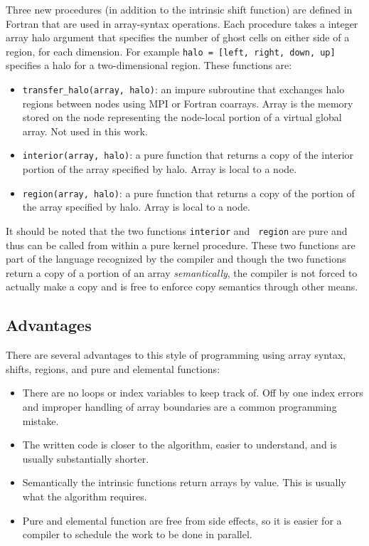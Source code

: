 Three new procedures (in addition to the intrinsic shift function) are
defined in Fortran that are used in array-syntax operations.  Each
procedure takes a integer array halo argument that specifies the
number of ghost cells on either side of a region, for each dimension.
For example {\tt halo = [left, right, down, up]} specifies a halo for
a two-dimensional region.  These functions are:

\begin{itemize}

\item {\tt transfer\_halo(array, halo)}: an impure subroutine that
  exchanges halo regions between nodes using MPI or Fortran
  coarrays. Array is the memory stored on the node representing the
  node-local portion of a virtual global array. Not used in this work.

\item {\tt interior(array, halo)}: a pure function that returns a copy of
  the interior portion of the array specified by halo. Array is
  local to a node.

\item {\tt region(array, halo)}: a pure function that returns a copy of
  the portion of the array specified by halo.  Array is local to a node.

\end{itemize}

It should be noted that the two functions {\tt interior} and {\tt
  region} are pure and thus can be called from within a pure kernel
procedure.  These two functions are part of the language recognized by
the compiler and though the two functions return a copy of a portion
of an array \emph{semantically}, the compiler is not forced to
actually make a copy and is free to enforce copy semantics through
other means.

\subsection{Advantages}

There are several advantages to this style of programming using array
syntax, shifts, regions, and pure and elemental functions:

\begin{itemize}
\item There are no loops or index variables to keep track of.  Off by
  one index errors and improper handling of array boundaries are a
  common programming mistake.
\item The written code is closer to the algorithm, easier to
  understand, and is usually substantially shorter.
\item Semantically the intrinsic functions return arrays by value.
  This is usually what the algorithm requires.
\item Pure and elemental function are free from side effects, so it is
  easier for a compiler to schedule the work to be done in parallel.
\end{itemize}

